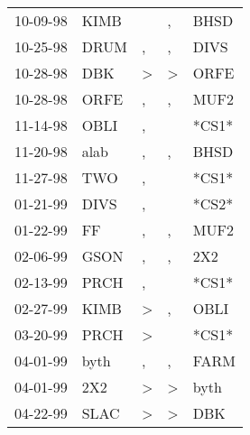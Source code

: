 \begin{supertabular}{p{0.07\textwidth}p{0.06\textwidth}p{0.02\textwidth}p{0.02\textwidth}p{0.06\textwidth}}
          10-09-98\textsuperscript{} &  KIMB\textsuperscript{} &               &             , &  BHSD\textsuperscript{} \\
          10-25-98\textsuperscript{} &  DRUM\textsuperscript{} &             , &             , &  DIVS\textsuperscript{} \\
          10-28-98\textsuperscript{} &   DBK\textsuperscript{} &  \textgreater &  \textgreater &  ORFE\textsuperscript{} \\
          10-28-98\textsuperscript{} &  ORFE\textsuperscript{} &             , &             , &  MUF2\textsuperscript{} \\
          11-14-98\textsuperscript{} &  OBLI\textsuperscript{} &             , &               &                   *CS1* \\
          11-20-98\textsuperscript{} &  alab\textsuperscript{} &             , &             , &  BHSD\textsuperscript{} \\
          11-27-98\textsuperscript{} &   TWO\textsuperscript{} &             , &               &                   *CS1* \\
          01-21-99\textsuperscript{} &  DIVS\textsuperscript{} &             , &               &                   *CS2* \\
          01-22-99\textsuperscript{} &    FF\textsuperscript{} &             , &             , &  MUF2\textsuperscript{} \\
          02-06-99\textsuperscript{} &  GSON\textsuperscript{} &             , &             , &   2X2\textsuperscript{} \\
          02-13-99\textsuperscript{} &  PRCH\textsuperscript{} &             , &               &                   *CS1* \\
          02-27-99\textsuperscript{} &  KIMB\textsuperscript{} &  \textgreater &             , &  OBLI\textsuperscript{} \\
          03-20-99\textsuperscript{} &  PRCH\textsuperscript{} &  \textgreater &               &                   *CS1* \\
          04-01-99\textsuperscript{} &  byth\textsuperscript{} &             , &             , &  FARM\textsuperscript{} \\
          04-01-99\textsuperscript{} &   2X2\textsuperscript{} &  \textgreater &  \textgreater &  byth\textsuperscript{} \\
          04-22-99\textsuperscript{} &  SLAC\textsuperscript{} &  \textgreater &  \textgreater &   DBK\textsuperscript{} \\

\end{supertabular}
